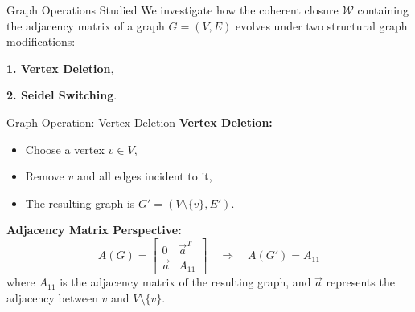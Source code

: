 \documentclass{beamer}
\begin{document}
\begin{frame}{Graph Operations Studied}
We investigate how the coherent closure \( \mathcal{W} \) containing the adjacency matrix of a graph $G=(V,E)$ evolves under two structural graph modifications:

\vspace{1em}
\textbf{1. Vertex Deletion},

\vspace{1em}
\textbf{2. Seidel Switching}.
\end{frame}

\begin{frame}{Graph Operation: Vertex Deletion}
\textbf{Vertex Deletion:}
\begin{itemize}
  \item Choose a vertex \( v \in V \),
  \item Remove \( v \) and all edges incident to it,
  \item The resulting graph is \( G' = (V \setminus \{v\}, E') \).
\end{itemize}

\vspace{1em}
\textbf{Adjacency Matrix Perspective:}
\[
A(G) =
\begin{bmatrix}
0 & \vec{a}^T\\
\vec{a}&A_{11}
\end{bmatrix}
\quad
\Rightarrow
\quad
A(G') = A_{11}
\]
where $A_{11}$ is the adjacency matrix of the resulting graph, and $\vec{a}$ represents the adjacency between $v$ and $V\setminus\{v\}$.
\end{frame}
\end{document}
